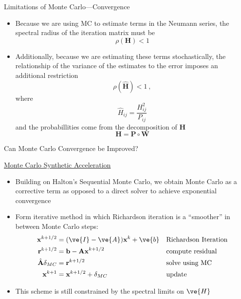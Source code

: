 \documentclass{beamer}
\begin{document}

\begin{frame}{Limitations of Monte Carlo---Convergence}

  \begin{itemize}
  \item Because we are using MC to estimate terms in the Neumann series, the
    spectral radius of the iteration matrix must be
    \[
    \rho(\mathbf{H}) < 1
    \]

  \item Additionally, because we are estimating these terms stochastically,
    the relationship of the variance of the estimates to the error imposes an
    additional restriction
    \[
    \rho(\hat{\mathbf{H}}) < 1\:,
    \]
    where
    \[
    \hat{H}_{ij} = \frac{H_{ij}^2}{P_{ij}}
    \]
    and the probabillities come from the decomposition of $\mathbf{H}$
    \[
    \mathbf{H} = \mathbf{P}\circ\mathbf{W}
    \]
  \end{itemize}
\end{frame}


\begin{frame}{Can Monte Carlo Convergence be Improved?}

  \underline{Monte Carlo Synthetic Acceleration}
  \vfill
  \begin{itemize}
  \item Building on Halton's Sequential Monte Carlo, we obtain Monte Carlo as
    a corrective term as opposed to a direct solver to achieve exponential
    convergence
  \item Form iterative method in which Richardson iteration is a ``smoother''
    in between Monte Carlo steps:
    \begin{align*}
      \mathbf{x}^{k+1/2} &= (\ve{I} - \ve{A})\mathbf{x}^k + \ve{b}
      && \text{Richardson Iteration}\\
      \mathbf{r}^{k+1/2} &= \mathbf{b} - \mathbf{Ax}^{k+1/2} &&
      \text{compute residual}\\
      \hat{\mathbf{A}} \mathbf{\delta}_{MC} &= \mathbf{r}^{k+1/2}
      && \text{solve using MC}\\
      \mathbf{x}^{k+1} &= \mathbf{x}^{k+1/2} + \delta_{MC}
      && \text{update}
    \end{align*}
  \item This scheme is still constrained by the spectral limits on $\ve{H}$
  \end{itemize}
  \vfill\centering

\end{frame}
\end{document}
